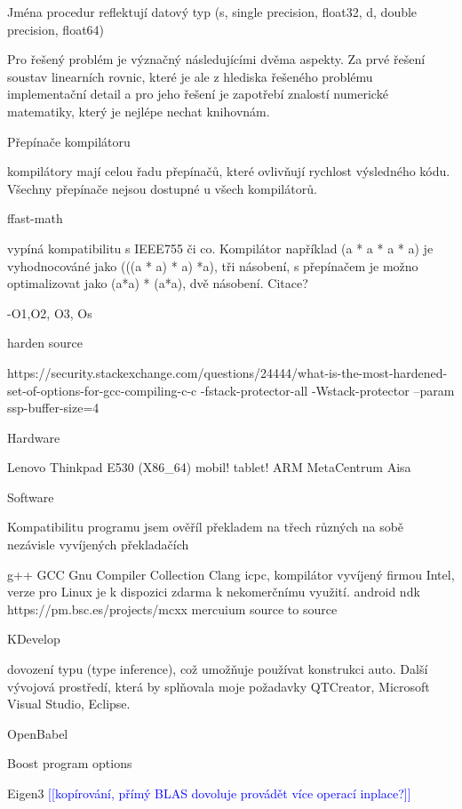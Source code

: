 \documentclass[10pt,draft,oneside]{fithesis2}
\newcommand\todo[1]{\textcolor{blue}{[[#1]]}}
\begin{document}
Jména procedur reflektují datový typ (s, single precision, float32, d, double precision, float64)







Pro řešený problém je význačný následujícími dvěma aspekty. Za prvé řešení soustav linearních rovnic, které je ale z hlediska řešeného problému implementační detail a pro jeho řešení je zapotřebí znalostí numerické matematiky, který je nejlépe nechat knihovnám.

Přepínače kompilátoru

kompilátory mají celou řadu přepínačů, které ovlivňují rychlost výsledného kódu. Všechny přepínače nejsou dostupné u všech kompilátorů.

ffast-math

vypíná kompatibilitu s IEEE755 či co. Kompilátor například (a * a * a * a) je vyhodnocováné jako (((a * a) * a) *a), tři násobení, s přepínačem je možno optimalizovat jako (a*a) * (a*a), dvě násobení. Citace?

-O1,O2, O3, Os

harden source

https://security.stackexchange.com/questions/24444/what-is-the-most-hardened-set-of-options-for-gcc-compiling-c-c
-fstack-protector-all -Wstack-protector --param ssp-buffer-size=4 



Hardware

Lenovo Thinkpad E530 (X86\_64)
mobil! tablet! ARM
MetaCentrum
Aisa

Software

Kompatibilitu programu jsem ověříl překladem na třech různých na sobě nezávisle vyvíjených překladačích

g++ GCC Gnu Compiler Collection
Clang
icpc, kompilátor vyvíjený firmou Intel, verze pro Linux je k dispozici zdarma k nekomerčnímu využití.
android ndk
https://pm.bsc.es/projects/mcxx mercuium source to source

KDevelop

dovození typu (type inference), což umožňuje používat konstrukci auto. Další vývojová prostředí, která by splňovala moje požadavky QTCreator, Microsoft Visual Studio, Eclipse.

OpenBabel

Boost program options

Eigen3
\todo{kopírování, přímý BLAS dovoluje provádět více operací inplace?}
\end{document}

